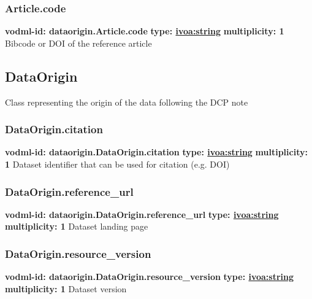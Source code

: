     \subsubsection{Article.code}
      \textbf{vodml-id: dataorigin.Article.code} \newline
      \textbf{type: \hyperref[sect:ivoa]{ivoa:string}} \newline
      \textbf{multiplicity: 1} \newline
      Bibcode or DOI of the reference article

  \subsection{DataOrigin}
  \label{sect:dataorigin.DataOrigin}
    Class representing the origin of the data following the DCP note

    \subsubsection{DataOrigin.citation}
      \textbf{vodml-id: dataorigin.DataOrigin.citation} \newline
      \textbf{type: \hyperref[sect:ivoa]{ivoa:string}} \newline
      \textbf{multiplicity: 1} \newline
      Dataset identifier that can be used for citation (e.g. DOI)

    \subsubsection{DataOrigin.reference\_url}
      \textbf{vodml-id: dataorigin.DataOrigin.reference\_url} \newline
      \textbf{type: \hyperref[sect:ivoa]{ivoa:string}} \newline
      \textbf{multiplicity: 1} \newline
      Dataset landing page

    \subsubsection{DataOrigin.resource\_version}
      \textbf{vodml-id: dataorigin.DataOrigin.resource\_version} \newline
      \textbf{type: \hyperref[sect:ivoa]{ivoa:string}} \newline
      \textbf{multiplicity: 1} \newline
      Dataset version

